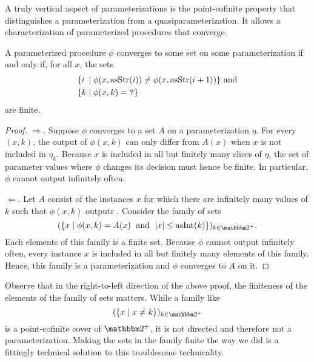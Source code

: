 A truly vertical aspect of parameterizations is the point-cofinite property that distinguishes a parameterization from a quasiparameterization.
It allows a characterization of parameterized procedures that converge.
\begin{lemma}
\label{lem:convergent_finite}
  A parameterized procedure $\phi$ converges to some set on some parameterization if and only if, for all $x$, the sets
  \begin{align*}
    &\{\mathrlap{i}\phantom{k} \st \phi(x, \asStr(i)) \neq \phi(x, \asStr(i + 1))\}\text{ and} \\
    &\{k \st \phi(x, k) = \bits{?}\}
  \end{align*}
  are finite.
\end{lemma}
\begin{proof}
  $\Longrightarrow$.
  Suppose $\phi$ converges to a set $A$ on a parameterization $\eta$.
  For every $(x, k)$, the output of $\phi(x, k)$ can only differ from $A(x)$ when $x$ is not included in $\eta_k$.
  Because $x$ is included in all but finitely many slices of $\eta$, the set of parameter values where $\phi$ changes its decision must hence be finite.
  In particular, $\phi$ cannot output  infinitely often.

  $\Longleftarrow$.
  Let $A$ consist of the instances $x$ for which there are infinitely many values of $k$ such that $\phi(x, k)$ outputs .
  Consider the family of sets
  \begin{equation*}
    (\{x \st \phi(x, k) = A(x) \reland \length{x} \le \asNat(k)\})_{k \in \binary^+}.
  \end{equation*}
  Each elements of this family is a finite set.
  Because $\phi$ cannot output  infinitely often, every instance $x$ is included in all but finitely many elements of this family.
  Hence, this family is a parameterization and $\phi$ converges to $A$ on it.
\end{proof}

Observe that in the right-to-left direction of the above proof, the finiteness of the elements of the family of sets matters.
While a family like
\begin{equation*}
  (\{x \st x \neq k\})_{k \in \binary^+}
\end{equation*}
is a point-cofinite cover of $\binary^+$, it is not directed and therefore not a parameterization.
Making the sets in the family finite the way we did is a fittingly technical solution to this troublesome technicality.

